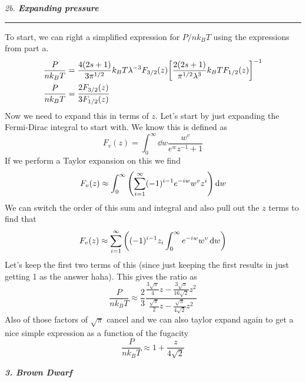 \documentclass[12pt, letterpaper, twoside]{article}
\newcommand{\question}[1]{{\noindent \it #1}}
\newcommand{\answer}[1]{
    \par\noindent\rule{\textwidth}{0.4pt}#1\vspace{0.5cm}
}
\begin{document}
\question{2b. \textbf{Expanding pressure}}
\answer{
    To start, we can right a simplified expression for $P / n k_B T$ using the expressions from part a.
    \begin{align}
        \frac{P}{n k_B T} &= \frac{4(2s + 1)}{3 \pi^{1/2}} k_B T \lambda^{-3} F_{3/2}(z) \qty[\frac{2(2s + 1)}{\pi^{1/2} \lambda^3} k_B T F_{1/2}(z)]^{-1} \\
        \frac{P}{n k_B T} &= \frac{2 F_{3/2}(z)}{3 F_{1/2}(z)}
    \end{align}
    Now we need to expand this in terms of $z$. Let's start by just expanding the Fermi-Dirac integral to start with. We know this is defined as
    \begin{equation}
        F_v(z) = \int_0^\infty \dd{w} \frac{w^v}{e^w z^{-1} + 1}
    \end{equation}
    If we perform a Taylor expansion on this we find
    \begin{equation}
        F_v(z) \approx \int_0^\infty \qty(\sum_{i = 1}^{\infty} (-1)^{i - 1} e^{- i w} w^v z^i) \dd{w}
    \end{equation}
    We can switch the order of this sum and integral and also pull out the $z$ terms to find that
    \begin{equation}
        F_v(z) \approx \sum_{i = 1}^{\infty} \qty( (-1)^{i - 1} z_i \int_0^\infty e^{- i w} w^v \dd{w} )
    \end{equation}
    Let's keep the first two terms of this (since just keeping the first results in just getting 1 as the answer haha). This gives the ratio as
    \begin{equation}
        \frac{P}{n k_B T} \approx \frac{2}{3} \frac{\frac{3 \sqrt{\pi}}{4} z - \frac{3 \sqrt{\pi}}{16 \sqrt{2}} z^2}{\frac{\sqrt{\pi}}{2} z - \frac{\sqrt{\pi}}{4 \sqrt{2}} z^2}
    \end{equation}
    Also of those factors of $\sqrt{\pi}$ cancel and we can also taylor expand again to get a nice simple expression as a function of the fugacity
    \begin{equation}
        \boxed{ \frac{P}{n k_B T} \approx 1 + \frac{z}{4 \sqrt{2}} }
    \end{equation}
}

\pagebreak

\question{\textbf{3. Brown Dwarf}}
\end{document}
